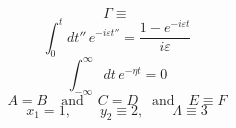\documentclass{article}
\begin{document}
\begin{equation}
\Gamma \equiv
\label{eq:e1}
\end{equation}
\begin{equation}
\int^{t}_{0} dt''\, e^{-i\varepsilon t''} = \frac{1-e^{-i\varepsilon t}}{i\varepsilon}
\label{eq:pp}
\end{equation}
\begin{equation}
\int_{-\infty}^{\infty} dt\, e^{-\eta t} = 0
\label{eq:both}
\end{equation}
\begin{equation}
A = B \quad\text{and}\quad C = D \quad\text{and}\quad E \equiv F
\label{eq:many}
\end{equation}
\begin{equation}
x_1 = 1, \qquad y_2 \equiv 2, \qquad \Lambda \equiv 3
\label{eq:three}
\end{equation}
\end{document}
